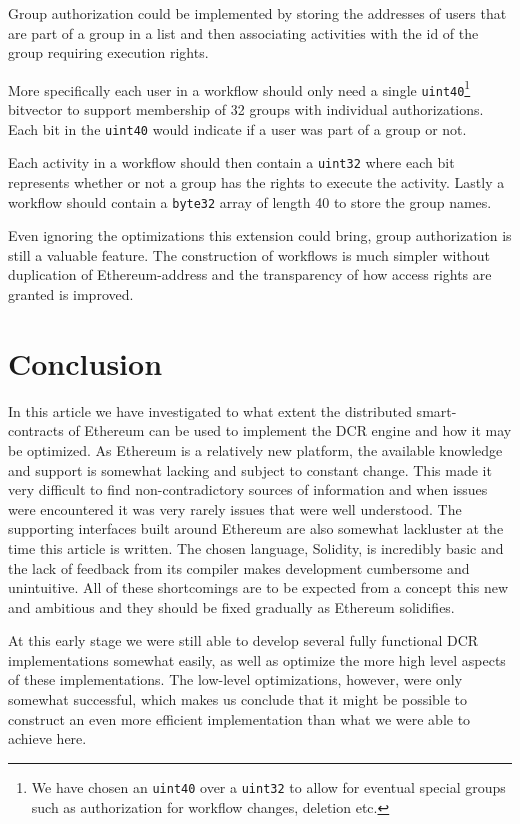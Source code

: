 \documentclass{article}
\begin{document}
		Group authorization could be implemented by storing the addresses of users that are part of a group in a list and then associating activities with the id of the group requiring execution rights.

		More specifically each user in a workflow should only need a single \texttt{uint40}\footnote{We have chosen an \texttt{uint40} over a \texttt{uint32} to allow for eventual special groups such as authorization for workflow changes, deletion etc.} bitvector to support membership of 32 groups with individual authorizations. Each bit in the \texttt{uint40} would indicate if a user was part of a group or not.

		Each activity in a workflow should then contain a \texttt{uint32} where each bit represents whether or not a group has the rights to execute the activity.
		Lastly a workflow should contain a \texttt{byte32} array of length 40 to store the group names.

		Even ignoring the optimizations this extension could bring, group authorization is still a valuable feature.
		The construction of workflows is much simpler without duplication of Ethereum-address and the transparency of how access rights are granted is improved.
		
	\section{Conclusion}

	In this article we have investigated to what extent the distributed smart-contracts of Ethereum can be used to implement the DCR engine and how it may be optimized.
	As Ethereum is a relatively new platform, the available knowledge and support is somewhat lacking and subject to constant change.
	This made it very difficult to find non-contradictory sources of information and when issues were encountered it was very rarely issues that were well understood.
	The supporting interfaces built around Ethereum are also somewhat lackluster at the time this article is written.
	The chosen language, Solidity, is incredibly basic and the lack of feedback from its compiler makes development cumbersome and unintuitive.
	All of these shortcomings are to be expected from a concept this new and ambitious and they should be fixed gradually as Ethereum solidifies.

	At this early stage we were still able to develop several fully functional DCR implementations somewhat easily, as well as optimize the more high level aspects of these implementations. 
	The low-level optimizations, however, were only somewhat successful, which makes us conclude that it might be possible to construct an even more efficient implementation than what we were able to achieve here.
\end{document}
